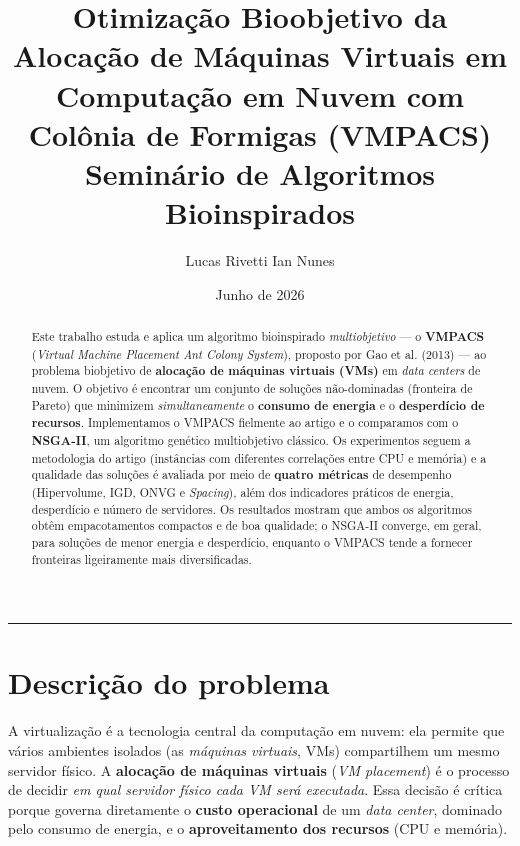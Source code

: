 \documentclass[11pt]{article}
\title{\textbf{Otimização Bioobjetivo da Alocação de Máquinas Virtuais em\\
Computação em Nuvem com Colônia de Formigas (VMPACS)}\\[4pt]
\large Seminário de Algoritmos Bioinspirados}
\author{Lucas Rivetti \qquad Ian Nunes}
\date{Junho de 2026}
\begin{document}
\maketitle

\begin{abstract}
\noindent Este trabalho estuda e aplica um algoritmo bioinspirado
\emph{multiobjetivo} --- o \textbf{VMPACS} (\emph{Virtual Machine Placement Ant
Colony System}), proposto por Gao et al. (2013) --- ao problema biobjetivo de
\textbf{alocação de máquinas virtuais (VMs)} em \emph{data centers} de nuvem. O
objetivo é encontrar um conjunto de soluções não-dominadas (fronteira de Pareto)
que minimizem \emph{simultaneamente} o \textbf{consumo de energia} e o
\textbf{desperdício de recursos}. Implementamos o VMPACS fielmente ao artigo e o
comparamos com o \textbf{NSGA-II}, um algoritmo genético multiobjetivo clássico.
Os experimentos seguem a metodologia do artigo (instâncias com diferentes
correlações entre CPU e memória) e a qualidade das soluções é avaliada por meio
de \textbf{quatro métricas} de desempenho (Hipervolume, IGD, ONVG e
\emph{Spacing}), além dos indicadores práticos de energia, desperdício e número
de servidores. Os resultados mostram que ambos os algoritmos obtêm
empacotamentos compactos e de boa qualidade; o NSGA-II converge, em geral, para
soluções de menor energia e desperdício, enquanto o VMPACS tende a fornecer
fronteiras ligeiramente mais diversificadas.
\end{abstract}

\tableofcontents
\vspace{6pt}\hrule\vspace{6pt}

\section{Descrição do problema}
A virtualização é a tecnologia central da computação em nuvem: ela permite que
vários ambientes isolados (as \emph{máquinas virtuais}, VMs) compartilhem um
mesmo servidor físico. A \textbf{alocação de máquinas virtuais}
(\emph{VM placement}) é o processo de decidir \emph{em qual servidor físico cada
VM será executada}. Essa decisão é crítica porque governa diretamente o
\textbf{custo operacional} de um \emph{data center}, dominado pelo consumo de
energia, e o \textbf{aproveitamento dos recursos} (CPU e memória).
\end{document}
